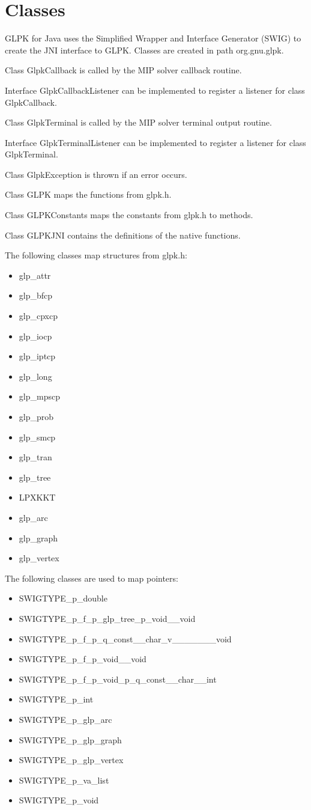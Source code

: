 \documentclass[a4paper,11pt]{report}
\begin{document}
\chapter{Classes}
GLPK for Java uses the Simplified Wrapper and Interface Generator (SWIG)\cite{SWIG} to create
the JNI interface to GLPK.
Classes are created in path org.gnu.glpk.

Class GlpkCallback is called by the MIP solver callback routine.

Interface GlpkCallbackListener can be implemented to register a listener for
class GlpkCallback.

Class GlpkTerminal is called by the MIP solver terminal output routine.

Interface GlpkTerminalListener can be implemented to register a listener for
class GlpkTerminal.

Class GlpkException is thrown if an error occurs.

Class GLPK maps the functions from glpk.h.

Class GLPKConstants maps the constants from glpk.h to methods.

Class GLPKJNI contains the definitions of the native functions.

The following classes map structures from glpk.h:
\begin{itemize}
\item glp\_attr
\item glp\_bfcp
\item glp\_cpxcp
\item glp\_iocp
\item glp\_iptcp
\item glp\_long
\item glp\_mpscp
\item glp\_prob
\item glp\_smcp
\item glp\_tran
\item glp\_tree
\item LPXKKT
\item glp\_arc
\item glp\_graph
\item glp\_vertex
\end{itemize}

The following classes are used to map pointers:
\begin{itemize}
\item SWIGTYPE\_p\_double
\item SWIGTYPE\_p\_f\_p\_glp\_tree\_p\_void\_\_void
\item SWIGTYPE\_p\_f\_p\_q\_const\_\_char\_v\_\_\_\_\_\_\_void
\item SWIGTYPE\_p\_f\_p\_void\_\_void
\item SWIGTYPE\_p\_f\_p\_void\_p\_q\_const\_\_char\_\_int
\item SWIGTYPE\_p\_int
\item SWIGTYPE\_p\_glp\_arc
\item SWIGTYPE\_p\_glp\_graph
\item SWIGTYPE\_p\_glp\_vertex
\item SWIGTYPE\_p\_va\_list
\item SWIGTYPE\_p\_void
\end{itemize}
\end{document}

